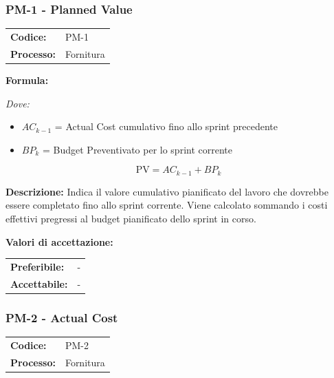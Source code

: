 \documentclass[a4paper,11pt,oneside]{scrartcl}
\begin{document}
\subsubsection{PM-1 - Planned Value}

\noindent
\begin{tabular}{@{}p{}p{}@{}}
\textbf{Codice:} & PM-1 \\
\textbf{Processo:} & Fornitura \\
\end{tabular}

\vspace{0.3cm}
\noindent\textbf{Formula:}

\noindent\textit{Dove:}
\begin{itemize}[leftmargin=1.5cm, topsep=0pt, itemsep=0pt]
    \item $AC_{k-1}$ = Actual Cost cumulativo fino allo sprint{\scriptsize{}} precedente
    \item $BP_k$ = Budget Preventivato per lo sprint corrente
\end{itemize}

\[
\text{PV} = AC_{k-1} + BP_k
\]

\noindent\textbf{Descrizione:} Indica il valore cumulativo pianificato del lavoro che dovrebbe essere completato fino allo sprint corrente. Viene calcolato sommando i costi effettivi pregressi al budget pianificato dello sprint in corso.

\vspace{0.2cm}
\noindent\textbf{Valori di accettazione:}
\vspace{0.1cm}

\noindent
\begin{tabular}{@{}ll@{}}
\textbf{Preferibile:} & - \\
\textbf{Accettabile:} & - \\
\end{tabular}

\subsubsection{PM-2 - Actual Cost}

\noindent
\begin{tabular}{@{}p{}p{}@{}}
\textbf{Codice:} & PM-2 \\
\textbf{Processo:} & Fornitura \\
\end{tabular}
\end{document}
